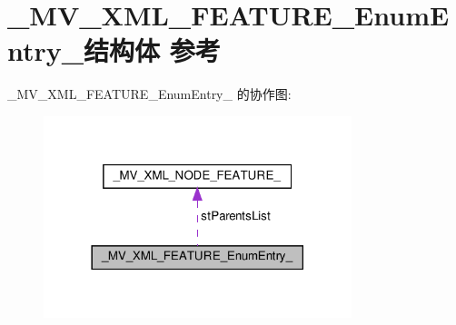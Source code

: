 \hypertarget{struct___m_v___x_m_l___f_e_a_t_u_r_e___enum_entry__}{}\section{\+\_\+\+M\+V\+\_\+\+X\+M\+L\+\_\+\+F\+E\+A\+T\+U\+R\+E\+\_\+\+Enum\+Entry\+\_\+结构体 参考}
\label{struct___m_v___x_m_l___f_e_a_t_u_r_e___enum_entry__}


\+\_\+\+M\+V\+\_\+\+X\+M\+L\+\_\+\+F\+E\+A\+T\+U\+R\+E\+\_\+\+Enum\+Entry\+\_\+ 的协作图\+:\nopagebreak
\begin{figure}[H]
\begin{center}
\leavevmode
\includegraphics[width=254pt]{struct___m_v___x_m_l___f_e_a_t_u_r_e___enum_entry____coll__graph}
\end{center}
\end{figure}
